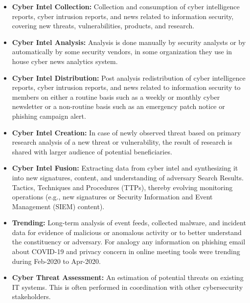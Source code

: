 \begin{itemize}
    \item \textbf{Cyber Intel Collection:} Collection and consumption of cyber intelligence reports, cyber intrusion reports, and news related to information security, covering new threats, vulnerabilities, products, and research. 
    
    \item \textbf{Cyber Intel Analysis:} Analysis is done manually by security analysts or by automatically by some security vendors, in some organization they use in house cyber news analytics system.

    \item \textbf{Cyber Intel Distribution:} Post analysis redistribution of cyber intelligence reports, cyber intrusion reports, and news related to information security to members on either a routine basis such as a weekly or monthly cyber newsletter or a non-routine basis such as an emergency patch notice or phishing campaign alert. 
    
    \item \textbf{Cyber Intel Creation:} In case of newly observed threat based on primary research analysis of a new threat or vulnerability, the result of research is shared with larger audience of potential beneficiaries.
    
    \item \textbf{Cyber Intel Fusion:} Extracting data from cyber intel and synthesizing it into new signatures, content, and understanding of adversary Search Results. Tactics, Techniques and Procedures (TTPs), thereby evolving monitoring operations 
    (e.g., new signatures or Security Information and Event Management (SIEM) content). 
    
    \item \textbf{Trending:} Long-term analysis of event feeds, collected malware, and incident data for evidence of malicious or anomalous activity or to better understand the constituency or adversary. For analogy any information on phishing email about COVID-19 and privacy concern in online meeting tools were trending during Feb-2020 to Apr-2020. 

    \item \textbf{Cyber Threat Assessment:} An estimation of potential threats on existing IT systems. This is often performed in coordination with other cybersecurity stakeholders. 
\end{itemize}

